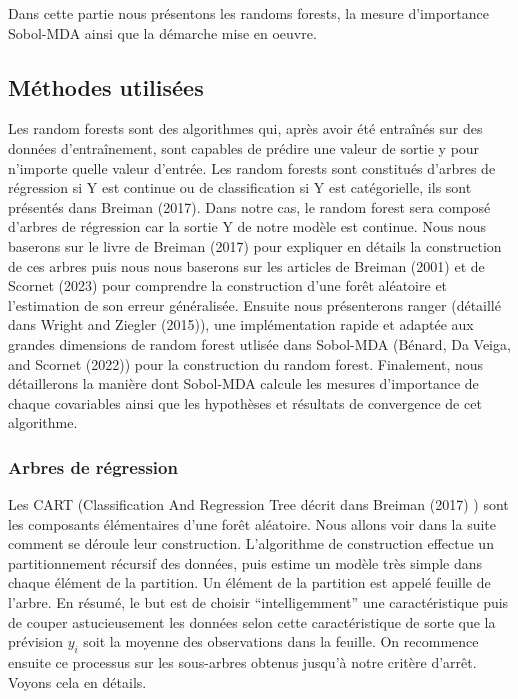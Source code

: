 \documentclass[
]{article}
\begin{document}
Dans cette partie nous présentons les randoms forests, la mesure
d'importance Sobol-MDA ainsi que la démarche mise en oeuvre.

\hypertarget{muxe9thodes-utilisuxe9es}{%
\subsection{Méthodes utilisées}\label{muxe9thodes-utilisuxe9es}}

Les random forests sont des algorithmes qui, après avoir été entraînés
sur des données d'entraînement, sont capables de prédire une valeur de
sortie y pour n'importe quelle valeur d'entrée. Les random forests sont
constitués d'arbres de régression si Y est continue ou de classification
si Y est catégorielle, ils sont présentés dans Breiman (2017). Dans
notre cas, le random forest sera composé d'arbres de régression car la
sortie Y de notre modèle est continue. Nous nous baserons sur le livre
de Breiman (2017) pour expliquer en détails la construction de ces
arbres puis nous nous baserons sur les articles de Breiman (2001) et de
Scornet (2023) pour comprendre la construction d'une forêt aléatoire et
l'estimation de son erreur généralisée. Ensuite nous présenterons ranger
(détaillé dans Wright and Ziegler (2015)), une implémentation rapide et
adaptée aux grandes dimensions de random forest utlisée dans Sobol-MDA
(Bénard, Da Veiga, and Scornet (2022)) pour la construction du random
forest. Finalement, nous détaillerons la manière dont Sobol-MDA calcule
les mesures d'importance de chaque covariables ainsi que les hypothèses
et résultats de convergence de cet algorithme.

\hypertarget{arbres-de-ruxe9gression}{%
\subsubsection{Arbres de régression}\label{arbres-de-ruxe9gression}}

Les CART (Classification And Regression Tree décrit dans Breiman (2017)
) sont les composants élémentaires d'une forêt aléatoire. Nous allons
voir dans la suite comment se déroule leur construction. L'algorithme de
construction effectue un partitionnement récursif des données, puis
estime un modèle très simple dans chaque élément de la partition. Un
élément de la partition est appelé feuille de l'arbre. En résumé, le but
est de choisir ``intelligemment'' une caractéristique puis de couper
astucieusement les données selon cette caractéristique de sorte que la
prévision \(y_i\) soit la moyenne des observations dans la feuille. On
recommence ensuite ce processus sur les sous-arbres obtenus jusqu'à
notre critère d'arrêt. Voyons cela en détails.
\end{document}
